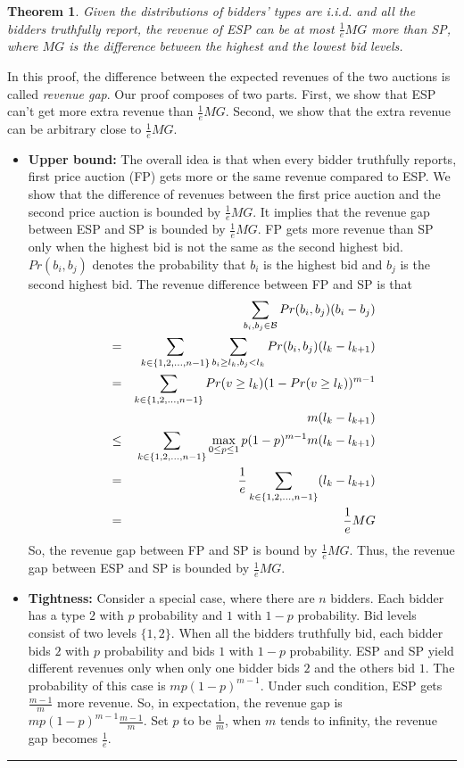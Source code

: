 \documentclass[letterpaper]{article}
\newtheorem{theorem}{Theorem}%
\newenvironment{proof}{{Proof:}}{\hfill\rule{2mm}{2mm}}
\begin{document}
\begin{theorem}
	Given the distributions of bidders' types are i.i.d. and all the bidders truthfully report, the revenue of ESP can be at most $\frac{1}{e}MG$ more than SP, where $MG$ is the difference between the highest and the lowest bid levels. 
\end{theorem}
\begin{proof}
	In this proof, the difference between the expected revenues of the two auctions is called \textit{revenue gap}.
	Our proof composes of two parts.
	First, we show that ESP can't get more extra revenue than $\frac{1}{e}MG$.
	Second, we show that the extra revenue can be arbitrary close to $\frac{1}{e}MG$.
\begin{itemize}
	\item \textbf{Upper bound: }The overall idea is that when every bidder truthfully reports, first price auction (FP) gets more or the same revenue compared to ESP.
	We show that the difference of revenues between the first price auction and the second price auction is bounded by $\frac{1}{e}MG$.
	It implies that the revenue gap between ESP and SP is bounded by $\frac{1}{e}MG$. 
	FP gets more revenue than SP only when the highest bid is not the same as the second highest bid.
	$Pr(b_i,b_j)$ denotes the probability that $b_i$ is the highest bid and $b_j$ is the second highest bid.
	The revenue difference between FP and SP is that
	\begin{eqnarray}
	\scriptsize
	&&\sum_{b_i,b_j\in \mathcal{B}}Pr(b_i,b_j)(b_i-b_j)\nonumber\\
	&=&\sum_{k\in \{1,2,\ldots,n-1\}}\sum_{b_i\geq l_k,  b_j<l_k}Pr(b_i,b_j)(l_k-l_{k+1})\nonumber\\
	&=&\sum_{k\in \{1,2,\ldots,n-1\}}Pr(v\geq l_k)(1-Pr(v\geq l_k))^{m-1}\nonumber\\
	&& m(l_{k}-l_{k+1})\nonumber\\
	&\leq&\sum_{k\in \{1,2,\ldots,n-1\}}\max_{0\leq p\leq 1}p(1-p)^{m-1}m(l_k-l_{k+1})\nonumber\\
	&=&\frac{1}{e}\sum_{k\in \{1,2,\ldots,n-1\}}(l_k-l_{k+1})\nonumber\\
	&=&\frac{1}{e}MG\nonumber
	\end{eqnarray}
	So, the revenue gap between FP and SP is bound by $\frac{1}{e}MG$.
	Thus, the revenue gap between ESP and SP is bounded by $\frac{1}{e}MG$.
	\item \textbf{Tightness:} Consider a special case, where there are $n$ bidders.
	Each bidder has a type $2$ with $p$ probability and $1$ with $1-p$ probability.
	Bid levels consist of two levels $\{1,2\}$.
	When all the bidders truthfully bid, each bidder bids $2$ with $p$ probability and bids $1$ with $1-p$ probability.
	ESP and SP yield different revenues only when only one bidder bids $2$ and the others bid $1$.
	The probability of this case is $mp(1-p)^{m-1}$.
	Under such condition, ESP gets $\frac{m-1}{m}$ more revenue.
	So, in expectation, the revenue gap is $mp(1-p)^{m-1}\frac{m-1}{m}$.
	Set $p$ to be $\frac{1}{m}$, when $m$ tends to infinity, the revenue gap becomes $\frac{1}{e}$.
\end{itemize}	
\end{proof}
\end{document}
